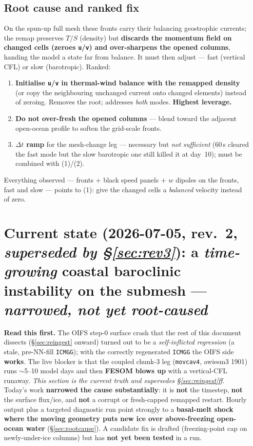 \documentclass[11pt,a4paper]{article}
\newcommand{\code}[1]{\texttt{\small #1}}
\begin{document}
\subsection{Root cause and ranked fix}
On the spun-up full mesh these fronts carry their balancing geostrophic currents; the remap
preserves $T/S$ (density) but \textbf{discards the momentum field on changed cells (zeroes
\code{u}/\code{v}) and over-sharpens the opened columns}, handing the model a state far from
balance. It must then adjust --- fast (vertical CFL) or slow (barotropic). Ranked:
\begin{enumerate}[leftmargin=1.6em,itemsep=2pt]
  \item \textbf{Initialise \code{u}/\code{v} in thermal-wind balance with the remapped density}
        (or copy the neighbouring unchanged current onto changed elements) instead of zeroing.
        Removes the root; addresses \emph{both} modes. \textbf{Highest leverage.}
  \item \textbf{Do not over-fresh the opened columns} --- blend toward the adjacent open-ocean
        profile to soften the grid-scale fronts.
  \item \textbf{$\Delta t$ ramp} for the mesh-change leg --- necessary but \emph{not sufficient}
        (60\,s cleared the fast mode but the slow barotropic one still killed it at day~10); must
        be combined with (1)/(2).
\end{enumerate}
Everything observed --- fronts $+$ black speed panels $+$ $w$ dipoles on the fronts, fast and
slow --- points to (1): give the changed cells a \emph{balanced} velocity instead of zero.

\section{Current state (2026-07-05, rev.~2, \emph{superseded by \S\ref{sec:rev3}}): a \emph{time-growing} coastal baroclinic instability on the submesh --- \emph{narrowed, not yet root-caused}}\label{sec:current}

\textbf{Read this first.} The OIFS step-0 surface crash that the rest of this document
dissects (\S\ref{sec:reingest} onward) turned out to be a \emph{self-inflicted regression}
(a stale, pre-NN-fill \code{ICMGG}); with the correctly regenerated \code{ICMGG} the OIFS
side \textbf{works}. The live blocker is that the coupled chunk-3 leg (\code{movcav4},
awiesm3 1901) runs $\sim$5--10 model days and then \textbf{FESOM blows up} with a
vertical-CFL runaway. \emph{This section is the current truth and supersedes
\S\ref{sec:reingest}ff.} Today's work \textbf{narrowed the cause substantially}: it is
\textbf{not} the timestep, \textbf{not} the surface flux/ice, and \textbf{not} a corrupt or
fresh-capped remapped restart. Hourly output plus a targeted diagnostic run point strongly to a
\textbf{basal-melt shock where the moving geometry puts new ice over above-freezing open-ocean
water} (\S\ref{sec:rootcause}). A candidate fix is drafted (freezing-point cap on
newly-under-ice columns) but has \textbf{not yet been tested} in a run.
\end{document}
